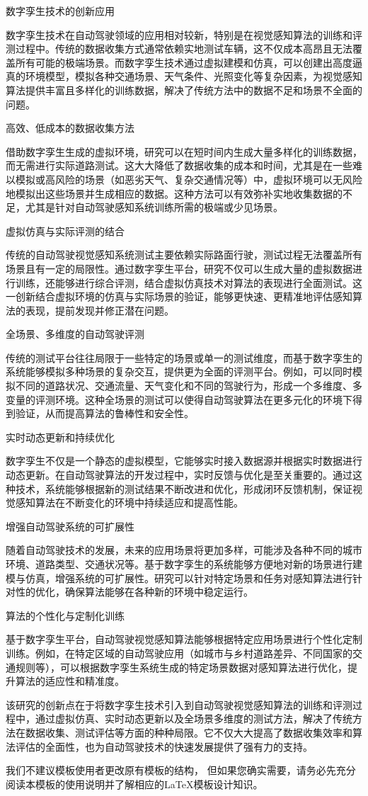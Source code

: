 数字孪生技术的创新应用

数字孪生技术在自动驾驶领域的应用相对较新，特别是在视觉感知算法的训练和评测过程中。传统的数据收集方式通常依赖实地测试车辆，这不仅成本高昂且无法覆盖所有可能的极端场景。而数字孪生技术通过虚拟建模和仿真，可以创建出高度逼真的环境模型，模拟各种交通场景、天气条件、光照变化等复杂因素，为视觉感知算法提供丰富且多样化的训练数据，解决了传统方法中的数据不足和场景不全面的问题。

高效、低成本的数据收集方法

借助数字孪生生成的虚拟环境，研究可以在短时间内生成大量多样化的训练数据，而无需进行实际道路测试。这大大降低了数据收集的成本和时间，尤其是在一些难以模拟或高风险的场景（如恶劣天气、复杂交通情况等）中，虚拟环境可以无风险地模拟出这些场景并生成相应的数据。这种方法可以有效弥补实地收集数据的不足，尤其是针对自动驾驶感知系统训练所需的极端或少见场景。

虚拟仿真与实际评测的结合

传统的自动驾驶视觉感知系统测试主要依赖实际路面行驶，测试过程无法覆盖所有场景且有一定的局限性。通过数字孪生平台，研究不仅可以生成大量的虚拟数据进行训练，还能够进行综合评测，结合虚拟仿真技术对算法的表现进行全面测试。这一创新结合虚拟环境的仿真与实际场景的验证，能够更快速、更精准地评估感知算法的表现，提前发现并修正潜在问题。

全场景、多维度的自动驾驶评测

传统的测试平台往往局限于一些特定的场景或单一的测试维度，而基于数字孪生的系统能够模拟多种场景的复杂交互，提供更为全面的评测平台。例如，可以同时模拟不同的道路状况、交通流量、天气变化和不同的驾驶行为，形成一个多维度、多变量的评测环境。这种全场景的测试可以使得自动驾驶算法在更多元化的环境下得到验证，从而提高算法的鲁棒性和安全性。

实时动态更新和持续优化

数字孪生不仅是一个静态的虚拟模型，它能够实时接入数据源并根据实时数据进行动态更新。在自动驾驶算法的开发过程中，实时反馈与优化是至关重要的。通过这种技术，系统能够根据新的测试结果不断改进和优化，形成闭环反馈机制，保证视觉感知算法在不断变化的环境中持续适应和提高性能。

增强自动驾驶系统的可扩展性

随着自动驾驶技术的发展，未来的应用场景将更加多样，可能涉及各种不同的城市环境、道路类型、交通状况等。基于数字孪生的系统能够方便地对新的场景进行建模与仿真，增强系统的可扩展性。研究可以针对特定场景和任务对感知算法进行针对性的优化，确保算法能够在各种新的环境中稳定运行。

算法的个性化与定制化训练

基于数字孪生平台，自动驾驶视觉感知算法能够根据特定应用场景进行个性化定制训练。例如，在特定区域的自动驾驶应用（如城市与乡村道路差异、不同国家的交通规则等），可以根据数字孪生系统生成的特定场景数据对感知算法进行优化，提升算法的适应性和精准度。

该研究的创新点在于将数字孪生技术引入到自动驾驶视觉感知算法的训练和评测过程中，通过虚拟仿真、实时动态更新以及全场景多维度的测试方法，解决了传统方法在数据收集、测试评估等方面的种种局限。它不仅大大提高了数据收集效率和算法评估的全面性，也为自动驾驶技术的快速发展提供了强有力的支持。

我们不建议模板使用者更改原有模板的结构，
但如果您确实需要，请务必先充分阅读本模板的使用说明并了解相应的\LaTeX{}模板设计知识。
